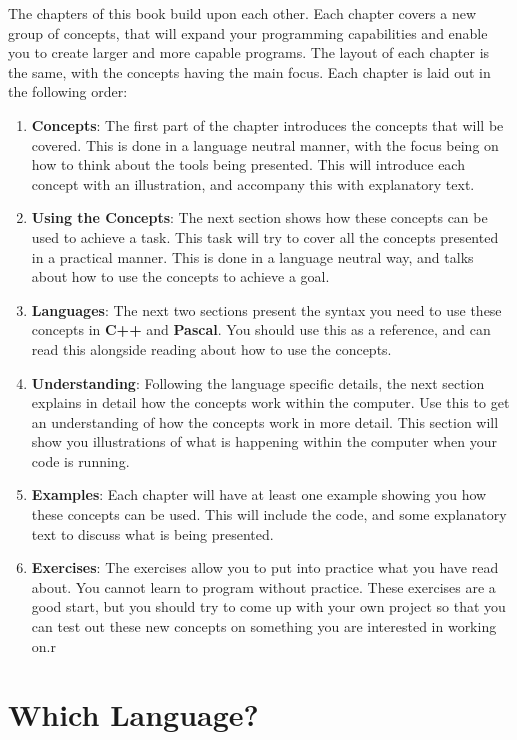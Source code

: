 The chapters of this book build upon each other. Each chapter covers a new group of concepts, that will expand your programming capabilities and enable you to create larger and more capable programs. The layout of each chapter is the same, with the concepts having the main focus. Each chapter is laid out in the following order:
\begin{enumerate}
  \item \textbf{Concepts}: The first part of the chapter introduces the concepts that will be covered. This is done in a language neutral manner, with the focus being on how to think about the tools being presented. This will introduce each concept with an illustration, and accompany this with explanatory text.
  \item \textbf{Using the Concepts}: The next section shows how these concepts can be used to achieve a task. This task will try to cover all the concepts presented in a practical manner. This is done in a language neutral way, and talks about how to use the concepts to achieve a goal.
  \item \textbf{Languages}: The next two sections present the syntax you need to use these concepts in \textbf{C++} and \textbf{Pascal}. You should use this as a reference, and can read this alongside reading about how to use the concepts.
  \item \textbf{Understanding}: Following the language specific details, the next section explains in detail how the concepts work within the computer. Use this to get an understanding of how the concepts work in more detail. This section will show you illustrations of what is happening within the computer when your code is running.
  \item \textbf{Examples}: Each chapter will have at least one example showing you how these concepts can be used. This will include the code, and some explanatory text to discuss what is being presented.
  \item \textbf{Exercises}: The exercises allow you to put into practice what you have read about. You cannot learn to program without practice. These exercises are a good start, but you should try to come up with your own project so that you can test out these new concepts on something you are interested in working on.r
\end{enumerate}

\section*{Which Language?} %
\label{sec:which_language_}

